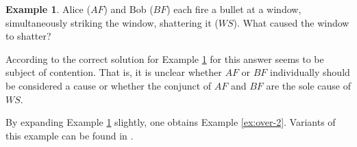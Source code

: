 \documentclass[11pt,a4paper]{book}
\theoremstyle{definition}
\theoremstyle{definition}
\newtheorem{example}{Example}[section]
\theoremstyle{definition}
\theoremstyle{remark}
\begin{document}
\begin{example}
\label{ex:over-1}
Alice ($AF$) and Bob ($BF$) each fire a bullet at a window, simultaneously striking the window, shattering it ($WS$). What caused the window to shatter? 

\begin{center}
\end{center}
\end{example}

According to \cite{hiddleston2005causal} the correct solution for Example \ref{ex:over-1} for this answer seems to be subject of contention. That is, it is unclear whether 
$AF$ or $BF$ individually should be considered a cause or whether the conjunct of $AF$ and $BF$ are the sole cause of $WS$.

By expanding Example \ref{ex:over-1} slightly, one obtains Example \ref{ex:over-2}. Variants of this example can be found in \parencite{glymour2010actual,chockler2015causal}.
\end{document}
